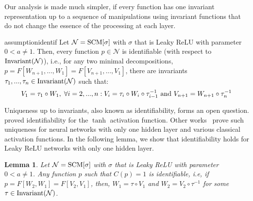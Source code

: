 \documentclass{article} %
\newtheorem{lem}{Lemma}
\newcommand{\Inv}{\textnormal{Invariant}}
\begin{document}
Our analysis is made much simpler, if every function has one invariant representation up to a sequence of manipulations using invariant functions that do not change the essence of the processing at each layer.


\begin{restatable}[Identifiability]{assumption}{identif}\label{assumption:identifiability} Let $\mathcal{N} = \textnormal{SCM}[\sigma]$ with $\sigma$ that is Leaky ReLU with parameter $0< a\neq 1$. Then, every function $p \in \mathcal{N}$ is identifiable (with respect to $\Inv(\mathcal{N})$), i.e., for any two minimal decompositions, $p = F[W_{n+1},...,W_1] = F[V_{n+1},...,V_1]$, there are invariants $\tau_1,...,\tau_n \in \Inv(\mathcal{N})$ such that: 
\begin{equation}
\begin{aligned}
&V_1 = \tau_1 \circ W_1, \; \forall i=2,...,n: V_i =  \tau_i \circ W_i \circ \tau^{-1}_{i-1} \textnormal{ and } V_{n+1} =  W_{n+1} \circ \tau^{-1}_{n}\\
\end{aligned}
\end{equation}
\end{restatable}

Uniqueness up to invariants, also known as identifiability, forms an open question. \cite{DBLP:conf/nips/FeffermanM93} proved identifiability for the $\tanh$ activation function. Other works~\citep{DBLP:journals/tnn/WilliamsonH95,albertini,DBLP:journals/nn/KurkovaK14,DBLP:journals/nn/Sussmann92} prove such uniqueness for neural networks with only one hidden layer and various classical activation functions. In the following lemma, we show that identifiability holds for Leaky ReLU networks with only one hidden layer.

 

\begin{lem}\label{lem:identifyDepth2} Let $\mathcal{N} = \textnormal{SCM}[\sigma]$ with $\sigma$ that is Leaky ReLU with parameter $0<a\neq 1$. Any function $p$ such that $C(p)=1$ is identifiable, i.e, if $p = F[W_2,W_1] = F[V_2,V_1]$, then, $W_1 = \tau \circ V_1$ and $W_2 = V_2 \circ \tau^{-1}$ for some $\tau \in \Inv(\mathcal{N})$.
\end{lem}
\end{document}
